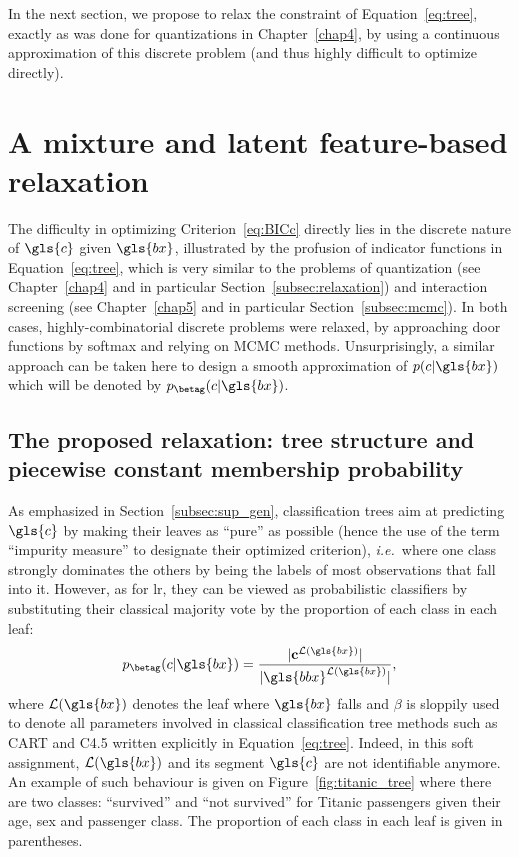 In the next section, we propose to relax the constraint of Equation~\eqref{eq:tree}, exactly as was done for quantizations in Chapter~\ref{chap4}, by using a continuous approximation of this discrete problem (and thus highly difficult to optimize directly).


\section{A mixture and latent feature-based relaxation}

The difficulty in optimizing Criterion~\eqref{eq:BICc} directly lies in the discrete nature of $\gls{c}$ given $\gls{bx}$, illustrated by the profusion of indicator functions in Equation~\eqref{eq:tree}, which is very similar to the problems of quantization (see Chapter~\ref{chap4} and in particular Section~\ref{subsec:relaxation}) and interaction screening (see Chapter~\ref{chap5} and in particular Section~\ref{subsec:mcmc}). In both cases, highly-combinatorial discrete problems were relaxed, by approaching door functions by softmax and relying on MCMC methods. Unsurprisingly, a similar approach can be taken here to design a smooth approximation of $p(c | \gls{bx})$ which will be denoted by $p_{\betag}(c | \gls{bx})$.

\subsection{The proposed relaxation: tree structure and piecewise constant membership probability} \label{subsec:relax_tree}

As emphasized in Section~\ref{subsec:sup_gen}, classification trees aim at predicting $\gls{c}$ by making their leaves as ``pure'' as possible (hence the use of the term ``impurity measure'' to designate their optimized criterion), \textit{i.e.}\ where one class strongly dominates the others by being the labels of most observations that fall into it. However, as for \gls{lr}, they can be viewed as probabilistic classifiers by substituting their classical majority vote by the proportion of each class in each leaf:
\begin{equation}
p_{\betag}(c | \gls{bx}) = \frac{|\mathbf{c}^{\mathcal{L}(\gls{bx})}|}{|\gls{bbx}^{\mathcal{L}(\gls{bx})}|},
\end{equation}
where $\mathcal{L}(\gls{bx})$ denotes the leaf where $\gls{bx}$ falls and $\beta$ is sloppily used to denote all parameters involved in classical classification tree methods such as CART and C4.5 written explicitly in Equation~\eqref{eq:tree}. Indeed, in this soft assignment, $\mathcal{L}(\gls{bx})$ and its segment $\gls{c}$ are not identifiable anymore. An example of such behaviour is given on Figure~\ref{fig:titanic_tree} where there are two classes: ``survived'' and ``not survived'' for Titanic passengers given their age, sex and passenger class. The proportion of each class in each leaf is given in parentheses.


